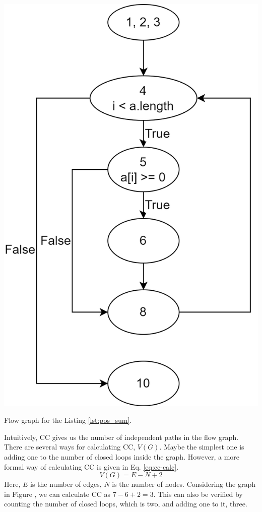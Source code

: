 \begin{marginfigure}[-2cm]
    \includegraphics{images/flow-graph-eg.png}
    \caption{Flow graph for the Listing \ref{lst:pos_sum}.}
\end{marginfigure}

Intuitively, CC gives us the number of independent paths in the flow graph. There are several ways for calculating CC, $V(G)$. Maybe the simplest one is adding one to the number of closed loops inside the graph. However, a more formal way of calculating CC is given in Eq. \ref{eq:cc-calc}.
\begin{equation}
\label{eq:cc-calc}
    V(G) = E - N + 2
\end{equation}
Here, $E$ is the number of edges, $N$ is the number of nodes. Considering the graph in Figure , we can calculate CC as $7 - 6 + 2 = 3$. This can also be verified by counting the number of closed loops, which is two, and adding one to it, three.

